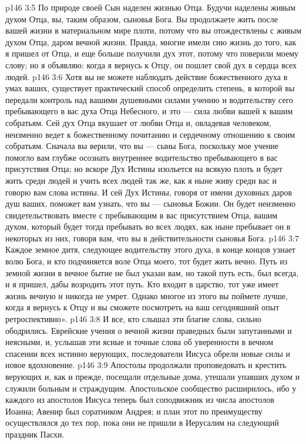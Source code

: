 \vs p146 3:5 По природе своей Сын наделен жизнью Отца. Будучи наделены живым духом Отца, вы, таким образом, сыновья Бога. Вы продолжаете жить после вашей жизни в материальном мире плоти, потому что вы отождествлены с живым духом Отца, даром вечной жизни. Правда, многие имели сию жизнь до того, как я пришел от Отца, и еще больше получили дух этот, потому что поверили моему слову; но я объявляю: когда я вернусь к Отцу, он пошлет свой дух в сердца всех людей.
\vs p146 3:6 Хотя вы не можете наблюдать действие божественного духа в умах ваших, существует практический способ определить степень, в которой вы передали контроль над вашими душевными силами учению и водительству сего пребывающего в вас духа Отца Небесного, и это --- сила любви вашей к вашим собратьям. Сей дух Отца вкушает от любви Отца и, овладевая человеком, неизменно ведет к божественному почитанию и сердечному отношению к своим собратьям. Сначала вы верили, что вы --- сыны Бога, поскольку мое учение помогло вам глубже осознать внутреннее водительство пребывающего в вас присутствия Отца; но вскоре Дух Истины изольется на всякую плоть и будет жить среди людей и учить всех людей так же, как я ныне живу среди вас и говорю вам слова истины. И сей Дух Истины, говоря от имени духовных даров душ ваших, поможет вам узнать, что вы --- сыновья Божии. Он будет неизменно свидетельствовать вместе с пребывающим в вас присутствием Отца, вашим духом, который будет тогда пребывать во всех людях, как ныне пребывает он в некоторых из них, говоря вам, что вы в действительности сыновья Бога.
\vs p146 3:7 Каждое земное дитя, следующее водительству этого духа, в конце концов узнает волю Бога, и кто подчиняется воле Отца моего, тот будет жить вечно. Путь из земной жизни в вечное бытие не был указан вам, но такой путь есть, был всегда, и я пришел, дабы возродить этот путь. Кто входит в царство, тот уже имеет жизнь вечную и никогда не умрет. Однако многое из этого вы поймете лучше, когда я вернусь к Отцу и вы сможете посмотреть на ваш сегодняшний опыт ретроспективно».
\vs p146 3:8 И все, кто слышал эти благие слова, сильно ободрились. Еврейские учения о вечной жизни праведных были запутанными и неясными, и, услышав эти ясные и точные слова об уверенности в вечном спасении всех истинно верующих, последователи Иисуса обрели новые силы и новое вдохновение.
\vs p146 3:9 \pc Апостолы продолжали проповедовать и крестить верующих и, как и прежде, посещали отдельные дома, утешали упавших духом и служили больным и страждущим. Апостольское сообщество расширилось, ибо у каждого из апостолов Иисуса теперь был соподвижник из числа апостолов Иоанна; Авенир был соратником Андрея; и план этот по преимуществу осуществлялся до тех пор, пока они не пришли в Иерусалим на следующий праздник Пасхи.
